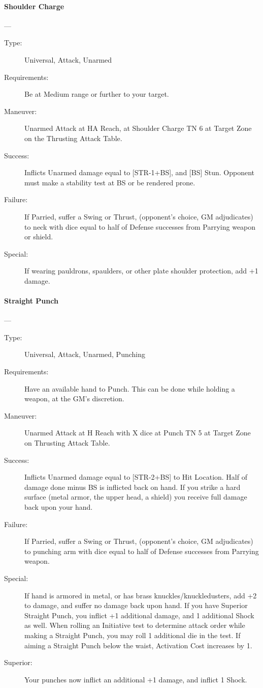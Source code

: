 \documentclass[oneside,11pt,english]{book}
\begin{document}
\paragraph{\large\label{man:Shoulder Charge}Shoulder Charge}---\quad{\large[X]}
\vspace{-10pt}\begin{description} 
\item [Type:] Universal, Attack, Unarmed 
\item [Requirements:] Be at Medium range or further to your target. 
\item [Maneuver:] Unarmed Attack at HA Reach, at Shoulder Charge TN 6 at Target Zone on the Thrusting 
  Attack Table. 
\item [Success:] Inflicts Unarmed damage equal to [STR-1+BS], and [BS] Stun. Opponent must make a stability 
  test at BS or be rendered prone. 
\item [Failure:] If Parried, suffer a Swing or Thrust, (opponent’s choice, GM adjudicates) to neck with dice 
  equal to half of Defense successes from Parrying weapon or shield. 
\item [Special:] If wearing pauldrons, spaulders, or other plate shoulder protection, add +1 damage. 
\end{description}


\paragraph{\large\label{man:Straight Punch}Straight Punch}---\quad{\large[X]}
\vspace{-10pt}\begin{description} 
\item [Type:] Universal, Attack, Unarmed, Punching 
\item [Requirements:] Have an available hand to Punch. This can be done while holding a weapon, at the GM's 
  discretion. 
\item [Maneuver:] Unarmed Attack at H Reach with X dice at Punch TN 5 at Target Zone on Thrusting Attack 
  Table. 
\item [Success:] Inflicts Unarmed damage equal to [STR-2+BS] to Hit Location. Half of damage done minus BS 
  is inflicted back on hand. If you strike a hard surface (metal armor, the upper head, a shield) you receive 
  full damage back upon your hand. 
\item [Failure:] If Parried, suffer a Swing or Thrust, (opponent’s choice, GM adjudicates) to punching arm with 
  dice equal to half of Defense successes from Parrying weapon. 
\item [Special:] If hand is armored in metal, or has brass knuckles/knuckledusters, add +2 to damage, and suffer 
  no damage back upon hand. If you have Superior Straight Punch, you inflict +1 additional damage, and 1 
  additional Shock as well. 
  When rolling an Initiative test to determine attack order while making a Straight Punch, you may roll 1 
  additional die in the test. 
  If aiming a Straight Punch below the waist, Activation Cost increases by 1. 
\item [Superior:] Your punches now inflict an additional +1 damage, and inflict 1 Shock. 
\end{description}
\end{document}
